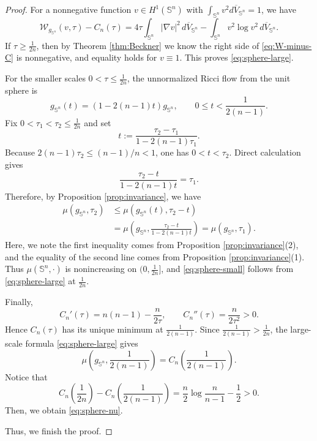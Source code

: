 \documentclass[11pt, reqno]{amsart}
\numberwithin{equation}{section}
\theoremstyle{remark}
\newcommand{\Sph}{\mathbb S}
\newcommand{\dbarV}[1]{d\overline V_{#1}}
\newcommand{\W}{\mathcal{W}}
\begin{document}
\begin{proof}
For a nonnegative function $v\in H^1(\Sph^n)$ with $\int_{\Sph^n}v^2\dbarV {\Sph^n}=1$, we have
\begin{equation}\label{eq:W-minus-C}
\W_{g_{\Sph^n}}(v,\tau)-C_n(\tau)
=4\tau\int_{\Sph^n}|\nabla v|^2\,\dbarV {\Sph^n}
-\int_{\Sph^n}v^2\log v^2\,\dbarV {\Sph^n}.
\end{equation}
If $\tau\geq\frac{1}{2n}$, then by Theorem \ref{thm:Beckner} we know the right side of \eqref{eq:W-minus-C} is
nonnegative, and equality holds for $v\equiv1$. This proves
\eqref{eq:sphere-large}.

For the smaller scales $0<\tau\leq\frac{1}{2n}$, the unnormalized Ricci flow from the unit sphere is
\begin{equation}\label{eq:round-flow}
g_{\Sph^n}(t)=(1-2(n-1)t)g_{\Sph^n},
\qquad0\leq t<\frac{1}{2(n-1)}.
\end{equation}
Fix $0<\tau_1<\tau_2\leq\frac{1}{2n}$ and set
\begin{equation}\label{eq:t-choice}
t:=\frac{\tau_2-\tau_1}{1-2(n-1)\tau_1}.
\end{equation}
Because $2(n-1)\tau_2\le(n-1)/n<1$, one has $0<t<\tau_2$. Direct calculation gives
\begin{equation}\label{eq:t-algebra3}
\frac{\tau_2-t}{1-2(n-1)t}=\tau_1.
\end{equation}
Therefore, by Proposition \ref{prop:invariance}, we have
\begin{align*}
\mu(g_{\Sph^n},\tau_2)
&\leq\mu(g_{\Sph^n}(t),\tau_2-t)\\
&=\mu\left(g_{\Sph^n},
\frac{\tau_2-t}{1-2(n-1)t}\right)
=\mu(g_{\Sph^n},\tau_1).
\end{align*}
Here, we note the first inequality comes from Proposition \ref{prop:invariance}(2), and the equality of the second line comes from Proposition \ref{prop:invariance}(1).
Thus $\mu(\Sph^n,\cdot)$ is nonincreasing on $(0,\frac{1}{2n}]$, and
\eqref{eq:sphere-small} follows from \eqref{eq:sphere-large} at $\frac{1}{2n}$.

Finally,
\begin{equation}\label{eq:C-derivatives}
C_n'(\tau)=n(n-1)-\frac n{2\tau},
\qquad
C_n''(\tau)=\frac n{2\tau^2}>0.
\end{equation}
Hence $C_n(\tau)$ has its unique minimum at $\frac{1}{2(n-1)}$. Since
$\frac{1}{2(n-1)}>\frac{1}{2n}$, the large-scale formula \eqref{eq:sphere-large} gives
\begin{equation}\label{eq:Cntau}
    \mu\left(g_{\Sph^n},\frac{1}{2(n-1)}\right)=C_n\left(\frac{1}{2(n-1)}\right).
\end{equation} 
Notice that 
$$C_n\left(\frac{1}{2n}\right)-C_n\left(\frac{1}{2(n-1)}\right)=\frac n2\log\frac n{n-1}-\frac12>0.$$
Then, we obtain \eqref{eq:sphere-nu}.

Thus, we finish the proof.
\end{proof}
\end{document}
